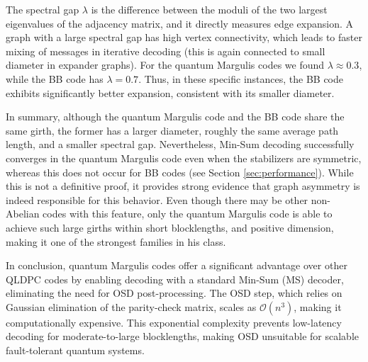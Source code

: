 \documentclass[a4paper,twocolumn,11pt,accepted=2026-05-03]{quantumarticle}
\begin{document}
The spectral gap $\lambda$ is the difference between the moduli of the two largest eigenvalues of the adjacency matrix, and it directly measures edge expansion. A graph with a large spectral gap has high vertex connectivity, which leads to faster mixing of messages in iterative decoding (this is again connected to small diameter in expander graphs). For the quantum Margulis codes we found $\lambda \approx 0.3$, while the BB code has $\lambda = 0.7$. Thus, in these specific instances, the BB code exhibits significantly better expansion, consistent with its smaller diameter.

In summary, although the quantum Margulis code and the BB code share the same girth, the former has a larger diameter, roughly the same average path length, and a smaller spectral gap. Nevertheless, Min-Sum decoding successfully converges in the quantum Margulis code even when the stabilizers are symmetric, whereas this does not occur for BB codes (see Section \ref{sec:performance}). While this is not a definitive proof, it provides strong evidence that graph asymmetry is indeed responsible for this behavior. Even though there may be other non-Abelian codes with this feature, only the quantum Margulis code is able to achieve such large girths within short blocklengths, and positive dimension, making it one of the strongest families in his class.

In conclusion, quantum Margulis codes offer a significant advantage over other QLDPC codes by enabling decoding with a standard Min-Sum (MS) decoder, eliminating the need for OSD post-processing. The OSD step, which relies on Gaussian elimination of the parity-check matrix, scales as $\mathcal{O}(n^3)$, making it computationally expensive. This exponential complexity prevents low-latency decoding for moderate-to-large blocklengths, making OSD unsuitable for scalable fault-tolerant quantum systems. 
\end{document}
